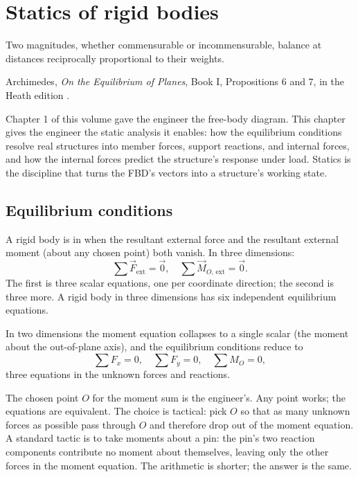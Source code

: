 \chapter{Statics of rigid bodies}
\label{vol03:ch02}

\epigraph{Two magnitudes, whether commensurable or incommensurable,
balance at distances reciprocally proportional to their weights.}{
Archimedes, \emph{On the Equilibrium of Planes}, Book I, Propositions
6 and 7, in the Heath edition \cite[pp.~189--192]{hist:archimedes-equilibrium}.}


\noindent
Chapter 1 of this volume gave the engineer the free-body diagram.
This chapter gives the engineer the static analysis it enables: how
the equilibrium conditions resolve real structures into member forces,
support reactions, and internal forces, and how the internal forces
predict the structure's response under load. Statics is the
discipline that turns the FBD's vectors into a structure's working
state.

\section{Equilibrium conditions}

A rigid body is in  when the resultant
external force and the resultant external moment (about any chosen
point) both vanish. In three dimensions:
\[
\sum \vec{F}_{\text{ext}} = \vec{0}, \quad
\sum \vec{M}_{O,\,\text{ext}} = \vec{0}.
\]
The first is three scalar equations, one per coordinate direction;
the second is three more. A rigid body in three dimensions has six
independent equilibrium equations.

In two dimensions the moment equation collapses to a single scalar
(the moment about the out-of-plane axis), and the equilibrium
conditions reduce to
\[
\sum F_x = 0, \quad \sum F_y = 0, \quad \sum M_O = 0,
\]
three equations in the unknown forces and reactions.

The chosen point $O$ for the moment sum is the engineer's. Any point
works; the equations are equivalent. The choice is tactical: pick $O$
so that as many unknown forces as possible pass through $O$ and
therefore drop out of the moment equation. A standard tactic is to
take moments about a pin: the pin's two reaction components contribute
no moment about themselves, leaving only the other forces in the
moment equation. The arithmetic is shorter; the answer is the same.

